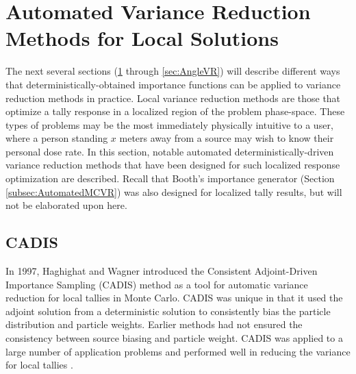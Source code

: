 \section{Automated Variance Reduction Methods for Local Solutions}
\label{sec:localVR}

The next several sections (\ref{sec:localVR} through \ref{sec:AngleVR})
will describe different ways that deterministically-obtained importance
functions
can be applied to variance reduction methods in practice. Local variance
reduction methods are those that optimize a tally response in a localized region
of the problem phase-space. These types of problems may be the most immediately
physically intuitive to a user,
where a person standing $x$ meters away from a source may wish to know their
personal dose rate. In this section, notable
automated deterministically-driven variance reduction methods that
have been designed for such localized response optimization are described.
Recall that Booth's importance generator (Section \ref{subsec:AutomatedMCVR})
was also designed for localized tally results, but will not be elaborated upon
here.

\subsection{CADIS}
\label{sec:CADIS}

In 1997, Haghighat and Wagner introduced the Consistent Adjoint-Driven
Importance Sampling (CADIS) method
\cite{wagner_automatic_1997,wagner_automated_1998,haghighat_monte_2003} as a
tool for automatic variance reduction for local tallies in Monte Carlo. CADIS
was unique in that it used the adjoint solution from a deterministic solution to
consistently bias the particle distribution and particle weights. Earlier
methods had not ensured the consistency between source biasing and particle weight. CADIS was applied to a large number of application problems and
performed well in reducing the variance for local tallies
\cite{wagner_review_2011}. 

